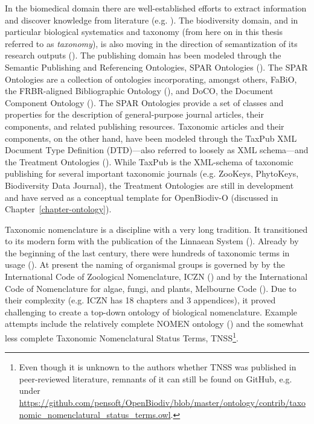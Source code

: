 In the biomedical domain there are well-established efforts to extract information and discover knowledge from literature (e.g. \cite{rebholz-schuhmann_facts_2005, momtchev_expanding_2009, williams_open_2012}).  The biodiversity domain, and in particular biological systematics and taxonomy (from here on in this thesis referred to as \emph{taxonomy}), is also moving in the direction of semantization of its research outputs (\cite{agosti_biodiversity_2006, patterson_taxonomic_2006,kennedy_scientific_2005,penev_fast_2010, tzitzikas_integrating_2013}).  The publishing domain has been modeled through the Semantic Publishing and Referencing Ontologies, SPAR Ontologies (\cite{peroni_semantic_2014}).   The SPAR Ontologies are a collection of ontologies incorporating, amongst others, FaBiO, the FRBR-aligned Bibliographic Ontology (\cite{peroni_fabio_2012}), and DoCO, the Document Component Ontology (\cite{constantin_document_2016}).   The SPAR Ontologies provide a set of classes and properties for the description of general-purpose journal articles, their components, and related publishing resources.  Taxonomic articles and their components, on the other hand, have been modeled through the TaxPub XML Document Type Definition (DTD)---also referred to loosely as XML schema---and the Treatment Ontologies (\cite{catapano_taxpub:_2010}).  While TaxPub is the XML-schema of taxonomic publishing for several important taxonomic journals (e.g. ZooKeys, PhytoKeys, Biodiversity Data Journal), the Treatment Ontologies are still in development and have served as a conceptual template for OpenBiodiv-O (discussed in Chapter~\ref{chapter-ontology}). 

Taxonomic nomenclature is a discipline with a very long tradition.  It transitioned to its modern form with the publication of the Linnaean System (\cite{linnaeus_systema_1758}).  Already by the beginning of the last century, there were hundreds of taxonomic terms in usage (\cite{witteveen_naming_2015}).  At present the naming of organismal groups is governed by by the International Code of Zoological Nomenclature, ICZN (\cite{international_commission_on_zoological_nomenclature_international_1999}) and by the International Code of Nomenclature for algae, fungi, and plants, Melbourne Code (\cite{mcneill_international_2012}).  Due to their complexity (e.g. ICZN has 18 chapters and 3 appendices), it proved challenging to create a top-down ontology of biological nomenclature. Example attempts include the relatively complete NOMEN ontology (\cite{dmitriev_nomen_2017}) and the somewhat less complete Taxonomic Nomenclatural Status Terms, TNSS\footnote{Even though it is unknown to the authors whether TNSS was published in peer-reviewed literature, remnants of it can still be found on GitHub, e.g. under \url{https://github.com/pensoft/OpenBiodiv/blob/master/ontology/contrib/taxonomic_nomenclatural_status_terms.owl}.}.

